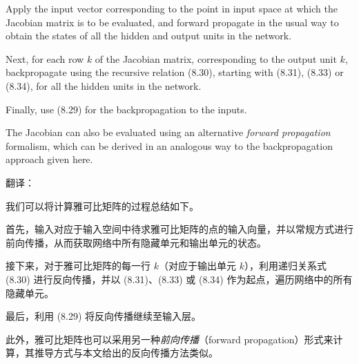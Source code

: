 \documentclass{article}
\begin{document}
Apply the input vector corresponding to the point in input space at which the Jacobian matrix is to be evaluated, and forward propagate in the usual way to obtain the states of all the hidden and output units in the network. 

Next, for each row $k$ of the Jacobian matrix, corresponding to the output unit $k$, backpropagate using the recursive relation (8.30), starting with (8.31), (8.33) or (8.34), for all the hidden units in the network. 

Finally, use (8.29) for the backpropagation to the inputs. 

The Jacobian can also be evaluated using an alternative \textit{forward propagation} formalism, which can be derived in an analogous way to the backpropagation approach given here.

{\color{red}
翻译：

我们可以将计算雅可比矩阵的过程总结如下。

首先，输入对应于输入空间中待求雅可比矩阵的点的输入向量，并以常规方式进行前向传播，从而获取网络中所有隐藏单元和输出单元的状态。

接下来，对于雅可比矩阵的每一行 $k$（对应于输出单元 $k$），利用递归关系式 (8.30) 进行反向传播，并以 (8.31)、(8.33) 或 (8.34) 作为起点，遍历网络中的所有隐藏单元。

最后，利用 (8.29) 将反向传播继续至输入层。

此外，雅可比矩阵也可以采用另一种\textit{前向传播}（forward propagation）形式来计算，其推导方式与本文给出的反向传播方法类似。
}
\end{document}
